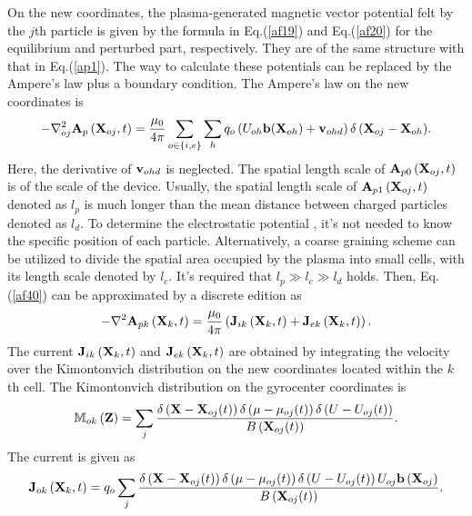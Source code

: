 \documentclass[12pt]{iopart}
\begin{document}
On the new coordinates, the plasma-generated magnetic vector potential felt by the $j$th particle is given by the formula in Eq.(\ref{af19}) and Eq.(\ref{af20}) for the equilibrium and perturbed part, respectively. They are of the same structure with that in Eq.(\ref{ap1}). The way to calculate these potentials can  be replaced by the Ampere's law plus a boundary condition. The Ampere's law on the new coordinates is
\begin{equation}\label{af40}
- \nabla _{oj}^2{{\bf{A}}_p}\left( {{{\bf{X}}_{oj}},t} \right) = \frac{{{\mu _0}}}{{4\pi }}\sum\limits_{o \in \{ i,e\} } {\sum\limits_h {{q_o}\left( {{U_{oh}}{\bf{b}}(\mathbf{X}_{oh}) + {{\bf{v}}_{ohd}}} \right)\delta \left( {{{\bf{X}}_{oj}} - {{\bf{X}}_{oh}}} \right)} }.
\end{equation}
Here, the derivative of $ {{\bf{v}}_{ohd}}$ is neglected.
The spatial length scale of ${{\bf{A}}_{p0}}\left( {{{\bf{X}}_{oj}},t} \right)$ is of the scale of the device. Usually, the spatial length scale of ${{\bf{A}}_{p1}}\left( {{{\bf{X}}_{oj}},t} \right)$ denoted as $l_p$ is much longer than the mean distance between charged particles denoted as $l_d$. To determine  the electrostatic potential , it's not needed to know the specific position of each particle. Alternatively, a coarse graining scheme can be utilized to divide the spatial area occupied by the plasma into small cells, with its length scale denoted by $l_c$. It's required that $l_p\gg l_c \gg l_d$ holds. Then, Eq.(\ref{af40}) can be approximated by a discrete edition as
\begin{equation}\label{af41}
- {\nabla ^2}{{\bf{A}}_{pk}}\left( {{{\bf{X}}_k},t} \right) = \frac{{{\mu _0}}}{{4\pi }}\left( {{{\bf{J}}_{ik}}\left( {{{\bf{X}}_k},t} \right) + {{\bf{J}}_{ek}}\left( {{{\bf{X}}_k},t} \right)} \right).
\end{equation}
The current ${{{\bf{J}}_{ik}}\left( {{{\bf{X}}_k},t} \right)}$ and ${{{\bf{J}}_{ek}}\left( {{{\bf{X}}_k},t} \right)}$ are obtained by integrating the velocity over the Kimontonvich distribution on the new coordinates located within the $k$th cell. The Kimontonvich distribution on the gyrocenter coordinates is
\begin{equation}\label{af42}
\mathbb{M}{_{ok}}\left( {\bf{Z}} \right) = \sum\limits_j {\frac{{\delta \left( {{\bf{X}} - {{\bf{X}}_{oj}(t)}} \right)\delta \left( {\mu  - {\mu _{oj}}(t)} \right)\delta \left( {U - {U_{oj}}(t)} \right)}}{{B\left( {{{\bf{X}}_{oj}}}(t) \right)}}}.
\end{equation}
The current is given as
\begin{equation}\label{af43}
{{\bf{J}}_{ok}}\left( {{{\bf{X}}_k},t} \right) = q_o\sum\limits_j {\frac{{\delta \left( {{\bf{X}} - {{\bf{X}}_{oj}}(t)} \right)\delta \left( {\mu  - {\mu _{oj}}(t)} \right)\delta \left( {U - {U_{oj}}(t)} \right){U_{oj}}{\bf{b}}\left( {{{\bf{X}}_{oj}}} \right)}}{{B\left( {{{\bf{X}}_{oj}}(t)} \right)}}}.
\end{equation}
\end{document}
